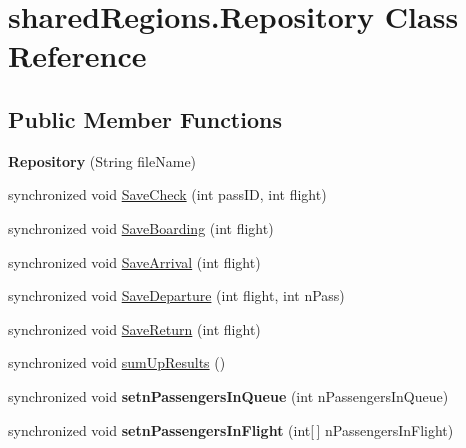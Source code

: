 \hypertarget{classshared_regions_1_1_repository}{}\section{shared\+Regions.\+Repository Class Reference}
\label{classshared_regions_1_1_repository}
\subsection*{Public Member Functions}
\begin{DoxyCompactItemize}
\item 
\mbox{\label{classshared_regions_1_1_repository_a977ec108837b2cfa0852d7e94f7f53dc}} 
{\bfseries Repository} (String file\+Name)
\item 
synchronized void \hyperlink{classshared_regions_1_1_repository_a0605714eca9f1b1d33bcf6aa829cca4e}{Save\+Check} (int pass\+ID, int flight)
\item 
synchronized void \hyperlink{classshared_regions_1_1_repository_a325b96a2510f6ebe8aad62f417a11e67}{Save\+Boarding} (int flight)
\item 
synchronized void \hyperlink{classshared_regions_1_1_repository_a6b066a95aa6b17fbf890698c82048cf5}{Save\+Arrival} (int flight)
\item 
synchronized void \hyperlink{classshared_regions_1_1_repository_a62d61843e1213324bf579c3db5c2fe96}{Save\+Departure} (int flight, int n\+Pass)
\item 
synchronized void \hyperlink{classshared_regions_1_1_repository_ace95e612ae18dffa8d67e34fa264153d}{Save\+Return} (int flight)
\item 
synchronized void \hyperlink{classshared_regions_1_1_repository_ad1f23250d858b294d3d443367c88a855}{sum\+Up\+Results} ()
\item 
\mbox{\label{classshared_regions_1_1_repository_afcbe0092a2ca34a1f8c13cd4d37a7bde}} 
synchronized void {\bfseries setn\+Passengers\+In\+Queue} (int n\+Passengers\+In\+Queue)
\item 
\mbox{\label{classshared_regions_1_1_repository_aea740a0c5225eaffb757bf31f690985d}} 
synchronized void {\bfseries setn\+Passengers\+In\+Flight} (int\mbox{[}$\,$\mbox{]} n\+Passengers\+In\+Flight)
\item 

\end{DoxyCompactItemize}
